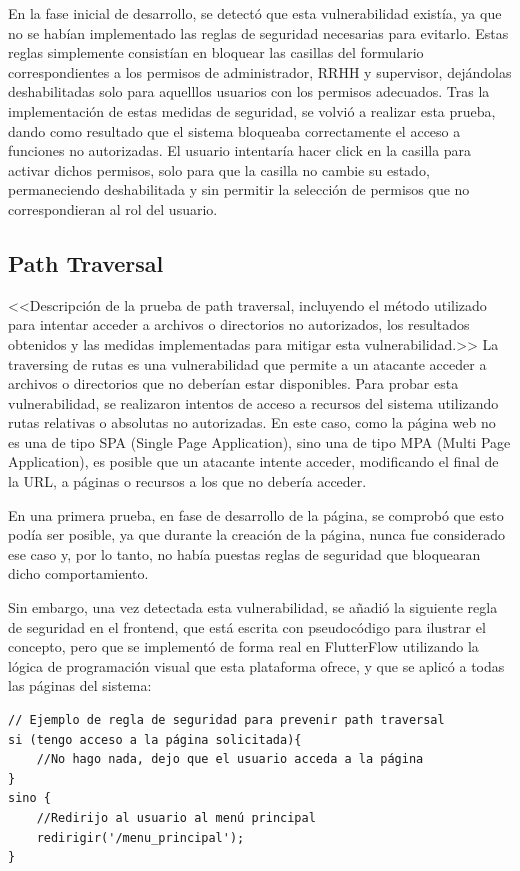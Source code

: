 En la fase inicial de desarrollo, se detectó que esta vulnerabilidad existía, ya que no se habían implementado las reglas de seguridad necesarias para evitarlo. Estas reglas simplemente consistían en bloquear las casillas del formulario correspondientes a los permisos de administrador, RRHH y supervisor, dejándolas deshabilitadas solo para aquelllos usuarios con los permisos adecuados.
Tras la implementación de estas medidas de seguridad, se volvió a realizar esta prueba, dando como resultado que el sistema bloqueaba correctamente el acceso a funciones no autorizadas. El usuario intentaría hacer click en la casilla para activar dichos permisos, solo para que la casilla no cambie su estado, permaneciendo deshabilitada y sin permitir la selección de permisos que no correspondieran al rol del usuario.

\subsection{Path Traversal}
<<Descripción de la prueba de path traversal, incluyendo el método utilizado para intentar acceder a archivos o directorios no autorizados, los resultados obtenidos y las medidas implementadas para mitigar esta vulnerabilidad.>>
La traversing de rutas es una vulnerabilidad que permite a un atacante acceder a archivos o directorios que no deberían estar disponibles. Para probar esta vulnerabilidad, se realizaron intentos de acceso a recursos del sistema utilizando rutas relativas o absolutas no autorizadas.
En este caso, como la página web no es una de tipo SPA (Single Page Application), sino una de tipo MPA (Multi Page Application), es posible que un atacante intente acceder, modificando el final de la URL, a páginas o recursos a los que no debería acceder.

En una primera prueba, en fase de desarrollo de la página, se comprobó que esto podía ser posible, ya que durante la creación de la página, nunca fue considerado ese caso y, por lo tanto, no había puestas reglas de seguridad que bloquearan dicho comportamiento.

Sin embargo, una vez detectada esta vulnerabilidad, se añadió la siguiente regla de seguridad en el frontend, que está escrita con pseudocódigo para ilustrar el concepto, pero que se implementó de forma real en FlutterFlow utilizando la lógica de programación visual que esta plataforma ofrece, y que se aplicó a todas las páginas del sistema:

\begin{verbatim}
// Ejemplo de regla de seguridad para prevenir path traversal
si (tengo acceso a la página solicitada){
    //No hago nada, dejo que el usuario acceda a la página
}
sino {
    //Redirijo al usuario al menú principal
    redirigir('/menu_principal');
}
\end{verbatim}

